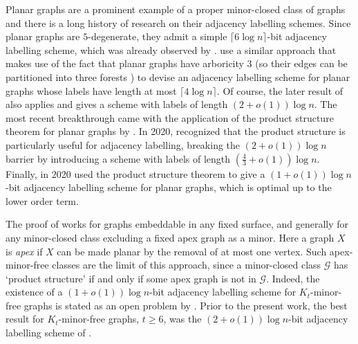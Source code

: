 \documentclass{patmorin}
\renewcommand{\geq}{\geqslant}
\newcommand{\vida}[1]{{\color{pink} VD: #1}}
\newcommand{\defin}[1]{\emph{\textcolor{brightmaroon}{#1}}}
\begin{document}
Planar graphs are a prominent example of a proper minor-closed class of graphs and there is a long history of research
on their adjacency labelling schemes.
Since planar graphs are $5$-degenerate,
they admit a simple $\lceil6\log n\rceil$-bit adjacency labelling scheme, which was already observed by \citet{muller:local}.
\citet{kannan.naor.ea:implicit} use a similar approach that makes use of the fact that planar graphs have arboricity 3 (so their edges can be partitioned into three forests \cite{nash-williams:edge-disjoint}) to devise an adjacency labelling scheme for planar graphs whose labels have length at most $\lceil4\log n\rceil$.
Of course, the later result of \citet{gavoille.labourel:shorter} also applies and gives a scheme with labels of length $(2+o(1))\log n$.
The most recent breakthrough came with the application of the product structure theorem for planar graphs by \citet{dujmovic.joret.ea:planar}.
In 2020, \citet{BGP22} recognized that the product structure is particularly useful for adjacency labelling, breaking the $(2+o(1))\log n$  barrier by introducing a scheme with labels of length $(\frac{4}{3}+o(1))\log n$.
Finally, in 2020 \citet{dujmovic.esperet.ea:adjacency} used the product structure theorem to give a $(1+o(1))\log n$-bit adjacency labelling scheme for planar graphs, which is optimal up to the lower order term.

The proof of \citet{dujmovic.esperet.ea:adjacency} works for  graphs embeddable in any fixed surface, and generally for any minor-closed class excluding a fixed apex graph as a minor. Here a graph $X$ is \defin{apex} if $X$ can be made planar by the removal of at most one vertex.
Such apex-minor-free classes are the limit of this approach, since a minor-closed class $\mathcal{G}$ has `product structure' if and only if some apex graph is not in $\mathcal{G}$. Indeed, the existence of a $(1+o(1))\log n$-bit adjacency labelling scheme for $K_t$-minor-free graphs is stated as an open problem by \citet[Section~6, Problem~2]{dujmovic.esperet.ea:adjacency}. Prior to the present work, the best result for $K_t$-minor-free graphs, $t\geq 6$, was the $(2+o(1))\log n$-bit adjacency labelling scheme of \citet{gavoille.labourel:shorter}.



\end{document}
